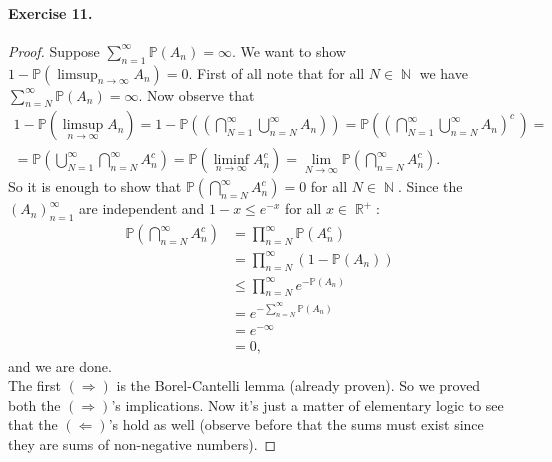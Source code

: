 \documentclass[12pt,a4paper]{report}
\theoremstyle{definition}
\theoremstyle{num.custom-title}
\DeclareMathOperator{\N}{\mathbb{N}}
\DeclareMathOperator{\R}{\mathbb{R}}
\renewcommand{\P}{\mathbb{P}}
\renewcommand{\1}{\mathbbm{1}}
\begin{document}
\paragraph{Exercise 11.} 
\begin{proof}
Suppose $\sum^{\infty}_{n=1}\P(A_n)=\infty$. We want to show $1-\P(\limsup_{n \rightarrow \infty} A_n) = 0$. First of all note that for all $N \in \N$ we have $\sum^{\infty}_{n=N}\P(A_n)=\infty$. Now observe that
\begin{multline*}
1 - \P(\limsup_{n \rightarrow \infty} A_n)  = 
1 - \P\left(\left(\bigcap_{N=1}^{\infty} \bigcup_{n=N}^{\infty}A_n\right)\right) =
\P\left(\left(\bigcap_{N=1}^{\infty} \bigcup_{n=N}^{\infty}A_n\right)^c \, \right) =\\
=\P\left(\bigcup_{N=1}^{\infty} \bigcap_{n=N}^{\infty}A_n^{c}\right)
= \P\left(\liminf_{n \rightarrow \infty}A_n^{c}\right)= \lim_{N \rightarrow \infty}\P\left(\bigcap_{n=N}^{\infty}A_n^{c}\right).
\end{multline*}
So it is enough to show that $\P\left(\bigcap_{n=N}^{\infty}A_n^{c}\right) = 0$ for all $N \in \N$. Since the $(A_n)^{\infty}_{n = 1}$ are independent and $1-x \leq e^{-x}$ for all $x \in \R^+$:
\begin{align*}
\P\left(\bigcap_{n=N}^{\infty}A_n^{c}\right) 
&= \prod^{\infty}_{n=N}\P\left(A_n^{c}\right) \\
&= \prod^{\infty}_{n=N}\left(1-\P\left(A_n\right)\right) \\
&\leq \prod^{\infty}_{n=N}e^{-\P(A_n)}\\
&=e^{-\sum^{\infty}_{n=N}\P(A_n)}\\
&=e^{-\infty}\\
&= 0,
\end{align*}
and we are done.\\
The first $(\Longrightarrow)$ is the Borel-Cantelli lemma (already proven). So we proved both the $(\Longrightarrow)$'s implications. Now it's just a matter of elementary logic to see that the $(\Longleftarrow)$'s hold as well (observe before that the sums must exist since they are sums of non-negative numbers).
\end{proof}
\end{document}
